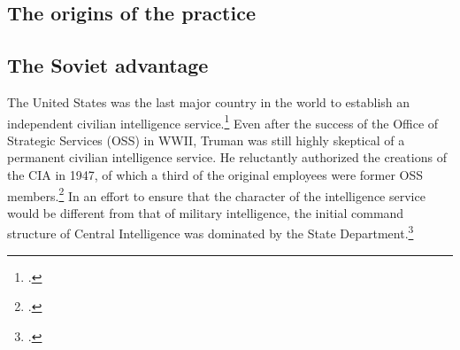 \documentclass{memoir}
\begin{document}
\begin{refsegment}

\subsection{The origins of the practice}

\subsection{The Soviet advantage}
The United States was the last major country in the world to establish an independent civilian intelligence service.\footcite[p.~35]{olson_fair_2006} Even after the success of the Office of Strategic Services (OSS) in WWII, Truman was still highly skeptical of a permanent civilian intelligence service. He reluctantly authorized the creations of the CIA in 1947, of which a third of the original employees were former OSS members.\footcite[p.~37]{olson_fair_2006} In an effort to ensure that the character of the intelligence service would be different from that of military intelligence, the initial command structure of Central Intelligence was dominated by the State Department.\footcite{troy_truman_1993}


\end{refsegment}
\end{document}
